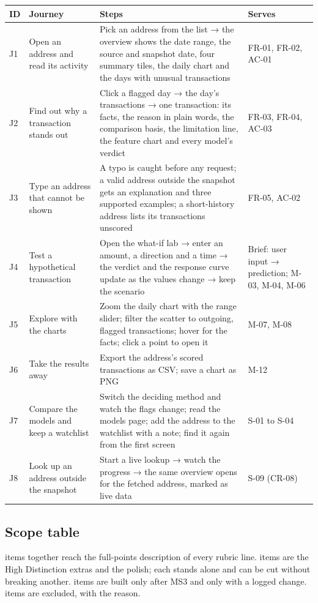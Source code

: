 \begin{longtable}{@{}L{0.8cm}L{4.2cm}L{6.9cm}L{2.1cm}@{}}
\toprule
\textbf{ID} & \textbf{Journey} & \textbf{Steps} & \textbf{Serves} \\
\midrule
\endhead
J1 & Open an address and read its activity & Pick an address from the list → the overview shows the date range, the source and snapshot date, four summary tiles, the daily chart and the days with unusual transactions & FR-01, FR-02, AC-01 \\
J2 & Find out why a transaction stands out & Click a flagged day → the day's transactions → one transaction: its facts, the reason in plain words, the comparison basis, the limitation line, the feature chart and every model's verdict & FR-03, FR-04, AC-03 \\
J3 & Type an address that cannot be shown & A typo is caught before any request; a valid address outside the snapshot gets an explanation and three supported examples; a short-history address lists its transactions unscored & FR-05, AC-02 \\
J4 & Test a hypothetical transaction & Open the what-if lab → enter an amount, a direction and a time → the verdict and the response curve update as the values change → keep the scenario & Brief: user input → prediction; M-03, M-04, M-06 \\
J5 & Explore with the charts & Zoom the daily chart with the range slider; filter the scatter to outgoing, flagged transactions; hover for the facts; click a point to open it & M-07, M-08 \\
J6 & Take the results away & Export the address's scored transactions as CSV; save a chart as PNG & M-12 \\
J7 & Compare the models and keep a watchlist & Switch the deciding method and watch the flags change; read the models page; add the address to the watchlist with a note; find it again from the first screen & S-01 to S-04 \\
J8 & Look up an address outside the snapshot & Start a live lookup → watch the progress → the same overview opens for the fetched address, marked as live data & S-09 (CR-08) \\
\bottomrule
\end{longtable}

\subsection{Scope table}
\label{sec:scopetable}

\must{} items together reach the full-points description of every rubric line.
\should{} items are the High Distinction extras and the polish; each stands alone and can be cut
without breaking another. \could{} items are built only after MS3 and only with a logged change.
\wont{} items are excluded, with the reason.

